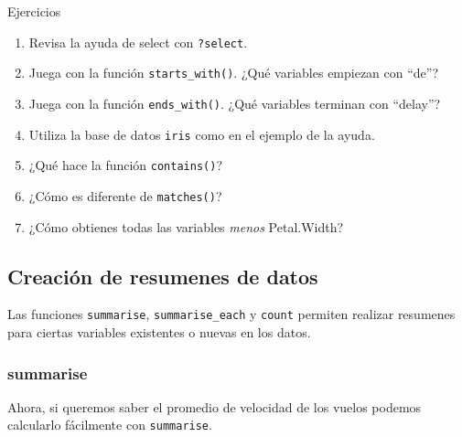 \documentclass[]{article}
\newenvironment{Shaded}{\begin{snugshade}}{\end{snugshade}}
\newcommand{\KeywordTok}[1]{\textcolor[rgb]{0.13,0.29,0.53}{\textbf{#1}}}
\newcommand{\DataTypeTok}[1]{\textcolor[rgb]{0.13,0.29,0.53}{#1}}
\newcommand{\StringTok}[1]{\textcolor[rgb]{0.31,0.60,0.02}{#1}}
\newcommand{\OperatorTok}[1]{\textcolor[rgb]{0.81,0.36,0.00}{\textbf{#1}}}
\newcommand{\NormalTok}[1]{#1}
\begin{document}
\begin{bclogo}[
  couleur=llred,
  arrondi=0,
  logo=\bcstop,
  barre=none,
  noborder=true]{Ejercicios}
\begin{enumerate}
\item{Revisa la ayuda de select con \texttt{?select}.}
\item Juega con la función \texttt{starts\_with()}. ¿Qué variables empiezan con ``de''?
\item Juega con la función \texttt{ends\_with()}. ¿Qué variables terminan con ``delay''?
\item Utiliza la base de datos \texttt{iris} como en el ejemplo de la ayuda.
\item ¿Qué hace la función \texttt{contains()}?
\item ¿Cómo es diferente de \texttt{matches()}?
\item ¿Cómo obtienes todas las variables \textit{menos} Petal.Width?
\end{enumerate}
\end{bclogo}

\subsection{Creación de resumenes de
datos}\label{creacion-de-resumenes-de-datos}

Las funciones \texttt{summarise}, \texttt{summarise\_each} y
\texttt{count} permiten realizar resumenes para ciertas variables
existentes o nuevas en los datos.

\subsubsection{summarise}\label{summarise}

Ahora, si queremos saber el promedio de velocidad de los vuelos podemos
calcularlo fácilmente con \texttt{summarise}.

\begin{Shaded}
\end{Shaded}
\end{document}

